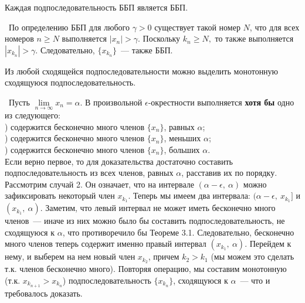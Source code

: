 \begin{theorem}
Каждая подпоследовательность ББП является ББП.

\vspace{2mm}

\proofname~По определению ББП для любого \(\gamma > 0\) существует
такой номер \(N\), что для всех номеров \(n \geq N\) выполняется \(|x_{n}| > \gamma\).
Поскольку \(k_{n} \geq N,\) то также выполняется \(|x_{k_{n}}| > \gamma\).
Следовательно, \(\{x_{k_{n}}\}\)~--- также ББП.~\qedsymbol
\end{theorem}

\begin{theorem}
Из любой сходящейся подпоследовательности можно выделить
монотонную сходящуюся подпоследовательность.

\vspace{2mm}

\proofname~Пусть \(\lim\limits_{n \to \infty}{x_{n}} = \alpha\). 
В произвольной \(\epsilon\)-окрестности выполняется \textbf{хотя бы} 
одно из следующего:\\
) содержится бесконечно много членов \(\{x_{n}\}\), равных \(\alpha\);\\
) содержится бесконечно много членов \(\{x_{n}\}\), меньших \(\alpha\);\\
) содержится бесконечно много членов \(\{x_{n}\}\), больших \(\alpha\).\\

\indent Если верно первое, то для доказательства достаточно составить подпоследовательность
из всех членов, равных \(\alpha\), расставив их по порядку. \\
\indent Рассмотрим случай 2. Он означает, что на интервале \((\alpha - \epsilon, ~ \alpha)\)
можно зафиксировать некоторый член \(x_{k_{1}}\). Теперь мы имеем два интервала:
\((\alpha - \epsilon, ~ x_{k_{1}}]\) и \((x_{k_{1}}, ~ \alpha)\). 
Заметим, что левый интервал не может иметь бесконечно много членов~--- иначе из них можно было
бы составить подпоследовательность, не сходящуюся к \(\alpha\), что противоречило
бы Теореме 3.1. Следовательно, бесконечно много членов теперь содержит именно 
правый интервал \((x_{k_{1}}, ~ \alpha)\). Перейдем к нему, и выберем на нем новый член
\(x_{k_{2}}\), причем \(k_{2} > k_{1}\) (мы можем это сделать т.к. членов бесконечно много).
Повторяя операцию, мы составим монотонную (т.к. \(x_{k_{n+1}} > x_{k_{n}}\)) 
подпоследовательность \(\{x_{k_{n}}\}\), сходящуюся к \(\alpha\)~---
что и требовалось доказать.~\qedsymbol
\end{theorem}

